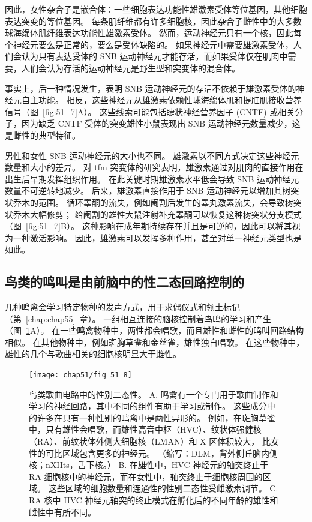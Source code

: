 因此，女性杂合子是嵌合体：一些细胞表达功能性雄激素受体等位基因，其他细胞表达突变的等位基因。
每条肌纤维都有许多细胞核，因此杂合子雌性中的大多数球海绵体肌纤维表达功能性雄激素受体。
然而，运动神经元只有一个核，因此每个神经元要么是正常的，要么是受体缺陷的。
如果神经元中需要雄激素受体，人们会认为只有表达受体的 SNB 运动神经元才能存活，而如果受体仅在肌肉中需要，人们会认为存活的运动神经元是野生型和突变体的混合体。


事实上，后一种情况发生，表明 SNB 运动神经元的存活不依赖于雄激素受体的神经元自主功能。
相反，这些神经元从雄激素依赖性球海绵体肌和提肛肌接收营养信号（图~\ref{fig:51_7}A）。
这些线索可能包括睫状神经营养因子 (CNTF) 或相关分子，因为缺乏 CNTF 受体的突变雄性小鼠表现出 SNB 运动神经元数量减少，这是雌性的典型特征。


男性和女性 SNB 运动神经元的大小也不同。
雄激素以不同方式决定这些神经元数量和大小的差异。
对 tfm 突变体的研究表明，雄激素通过对肌肉的直接作用在出生后早期发挥组织作用。
在此关键时期雄激素水平低会导致 SNB 运动神经元数量不可逆转地减少。
后来，雄激素直接作用于 SNB 运动神经元以增加其树突状乔木的范围。
循环睾酮的流失，例如阉割后发生的睾丸激素流失，会导致树突状乔木大幅修剪；
给阉割的雄性大鼠注射补充睾酮可以恢复这种树突状分支模式（图~\ref{fig:51_7}B）。
这种影响在成年期持续存在并且是可逆的，因此可以将其视为一种激活影响。
因此，雄激素可以发挥多种作用，甚至对单一神经元类型也是如此。



\subsection{鸟类的鸣叫是由前脑中的性二态回路控制的}

几种鸣禽会学习特定物种的发声方式，用于求偶仪式和领土标记（第~\ref{chap:chap55}~章）。
一组相互连接的脑核控制着鸟鸣的学习和产生（图~\ref{fig:51_8}A）。
在一些鸣禽物种中，两性都会唱歌，而且雄性和雌性的鸣叫回路结构相似。
在其他物种中，例如斑胸草雀和金丝雀，雄性独自唱歌。
在这些物种中，雄性的几个与歌曲相关的细胞核明显大于雌性。


\begin{figure}[htbp]
	\centering
	\texttt{[image: chap51/fig\_51\_8]}
	\caption{鸟类歌曲电路中的性别二态性。
		A. 鸣禽有一个专门用于歌曲制作和学习的神经回路，其中不同的组件有助于学习或制作。
		这些成分中的许多在只有一种性别的鸣禽中是两性异形的。
		例如，在斑胸草雀中，只有雄性会唱歌，而雄性高音中枢（HVC）、纹状体强健核（RA）、前纹状体外侧大细胞核（LMAN）和 X 区体积较大， 比女性的可比区域包含更多的神经元\cite{brainard2002songbirds}。 （缩写：DLM，背外侧丘脑内侧核；nXIIts，舌下核。）
		B. 在雄性中，HVC 神经元的轴突终止于 RA 细胞核中的神经元，而在女性中，轴突终止于细胞核周围的区域。 这些区域的细胞数量和连通性的性别二态性受雌激素调节\cite{morris2004sexual}。
		C. RA 核中 HVC 神经元轴突的终止模式在孵化后的不同年龄的雄性和雌性中有所不同\cite{konishi1985neuronal}。 }
	\label{fig:51_8}
\end{figure}


